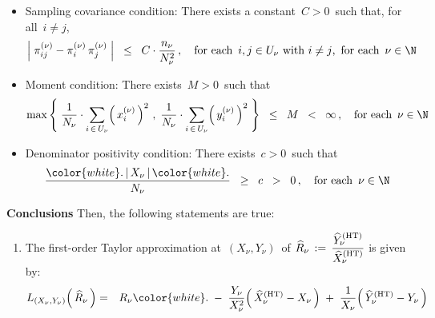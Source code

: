 \begin{theorem}
\begin{itemize}
\begin{equation*}
    \quad
    \textnormal{for each \,$i \in U_{\nu}$,\; and for each \,$\nu \in \N$}
    \end{equation*}
\item
    Sampling covariance condition:
    There exists a constant \,$C > 0$\, such that,
    for all \,$i \neq j$,\,
    \begin{equation*}
    \left\vert\; \pi^{(\nu)}_{ij} - \pi^{(\nu)}_{i}\,\pi^{(\nu)}_{j} \;\right\vert
    \;\; \leq \;\;
        C\cdot\dfrac{n_{\nu}}{N_{\nu}^{2}}\,,
    \quad
    \textnormal{for each \,$i,j \in U_{\nu}$ with $i \neq j$,\, for each \,$\nu\in\N$}
    \end{equation*}
\item
    Moment condition:\;
    There exists \,$M > 0$\, such that
    \begin{equation*}
    \max\left\{\;
        \dfrac{1}{N_{\nu}}\cdot\underset{i\,\in\,U_{\nu}}{\sum}\!\left(\,x^{(\nu)}_{i}\,\right)^{2}
        \,,\;
        \dfrac{1}{N_{\nu}}\cdot\underset{i\,\in\,U_{\nu}}{\sum}\!\left(\,y^{(\nu)}_{i}\,\right)^{2}
        \;\right\}
    \;\; \leq \;\;M \;\; < \;\; \infty\,,
    \quad
    \textnormal{for each \,$\nu\in\N$}
    \end{equation*}
\item
    Denominator positivity condition:\;
    There exists \,$c > 0$\, such that
    \begin{equation*}
    \dfrac{
        {\color{white}.}
        \left\vert\,X_{\nu}\,\right\vert
        {\color{white}.}
        }{
        N_{\nu}
        }
    \;\; \geq \;\; c \;\; > \;\; 0\,,
    \quad
    \textnormal{for each \,$\nu\in\N$}
    \end{equation*}
\end{itemize}
\vskip 0.2cm
\noindent
\textbf{Conclusions}
\vskip 0.1cm
\noindent
Then, the following statements are true:
\begin{enumerate}
\item
    The first-order Taylor approximation at
    \,$(X_{\nu},Y_{\nu})$\,
    of
    \;$
    \widehat{R}_{\nu}
    \, := \,
        \dfrac{
            \widehat{Y}^{\textnormal{(HT)}}_{\nu}
            }{
            \widehat{X}^{\textnormal{(HT)}}_{\nu}
            }
    $\;
    is given by:
    \begin{eqnarray*}
    L_{(X_{\nu},Y_{\nu})}\!\left(\,\widehat{R}_{\nu}\,\right)
    & = &
        R_{\nu}
        {\color{white}.}
        \; - \;
        \dfrac{Y_{\nu}}{X_{\nu}^{2}}\!\left(\,\widehat{X}^{\textnormal{(HT)}}_{\nu} - X_{\nu} \,\right)
        \; + \;
        \dfrac{1}{X_{\nu}}\!\left(\,\widehat{Y}^{\textnormal{(HT)}}_{\nu} - Y_{\nu} \,\right)

\end{eqnarray*}
\end{enumerate}
\end{theorem}
